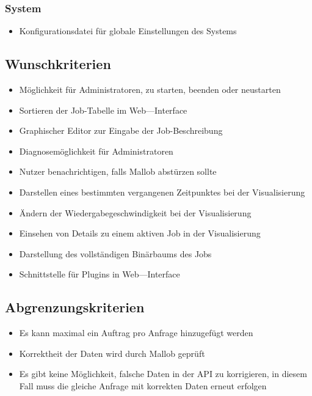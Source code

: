     \subsubsection{System}
        \begin{itemize}
            \item Konfigurationsdatei für globale Einstellungen des Systems
        \end{itemize}
        
        
\subsection{Wunschkriterien}
    \begin{itemize}
        \item Möglichkeit für Administratoren, zu starten, beenden oder neustarten
        \item Sortieren der Job-Tabelle im Web—Interface
        \item Graphischer Editor zur Eingabe der Job-Beschreibung
        \item Diagnosemöglichkeit für Administratoren
        \item Nutzer benachrichtigen, falls Mallob abstürzen sollte
        \item Darstellen eines bestimmten vergangenen Zeitpunktes bei der Visualisierung
        \item Ändern der Wiedergabegeschwindigkeit bei der Visualisierung
        \item Einsehen von Details zu einem aktiven Job in der Visualisierung
        \item Darstellung des vollständigen Binärbaums des Jobs
        \item Schnittstelle für Plugins in Web—Interface
    \end{itemize}
    
\subsection{Abgrenzungskriterien}
    \begin{itemize}
        \item Es kann maximal ein Auftrag pro Anfrage hinzugefügt werden
        \item Korrektheit der Daten wird durch Mallob geprüft
        \item Es gibt keine Möglichkeit, falsche Daten in der API zu korrigieren, in diesem Fall muss die gleiche Anfrage mit korrekten Daten erneut erfolgen
    \end{itemize}
